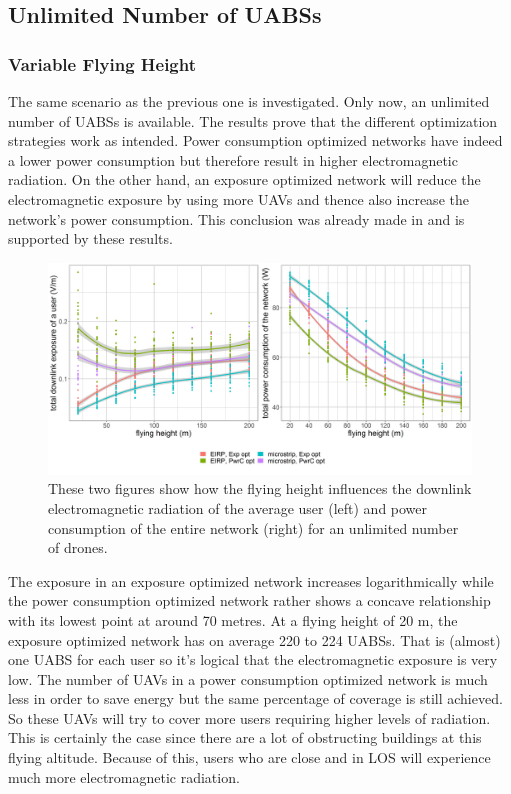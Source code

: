 \documentclass[twocolumn]{phdsymp} %
\begin{document}
\subsection{Unlimited Number of UABSs}
\subsubsection{Variable Flying Height}
The same scenario as the previous one is investigated. Only now, an unlimited number of \gls{UABS}s is available.
The results prove that the different optimization strategies work as intended.
Power consumption optimized networks have indeed a lower power consumption but therefore result in higher electromagnetic radiation.
On the other hand, an exposure optimized network will reduce the electromagnetic exposure by using more \gls{UAV}s and thence also increase the network's
power consumption.
This conclusion was already made in \cite{J1} and is supported by these results.
\begin{figure}[h!]
  \includegraphics[width=\linewidth]{../results/s3/fhvsdlAndPc.png}
  \caption{These two figures show how the flying height influences the downlink electromagnetic radiation of the average user (left) and 
  power consumption of the entire network (right) for an unlimited number of drones.}
  \label{fig:s3a_dlAndPc}
\end{figure}

The exposure in an exposure optimized network increases logarithmically while the power consumption optimized network rather 
shows a concave relationship with its lowest point at around 70 metres.
At a flying height of 20 m, the exposure optimized network has on average 220 to 224 \gls{UABS}s. That is (almost) one \gls{UABS} for each user
so it's logical that the electromagnetic exposure is very low.
The number of \gls{UAV}s in a power consumption optimized network is much less in order 
to save energy but the same percentage of coverage is still achieved.
So these \gls{UAV}s will try to cover more users requiring higher levels of radiation. This is certainly the case 
since there are a lot of obstructing buildings at this flying altitude.
Because of this, users who are close and in \gls{LOS} will experience much more electromagnetic radiation.
\end{document}
